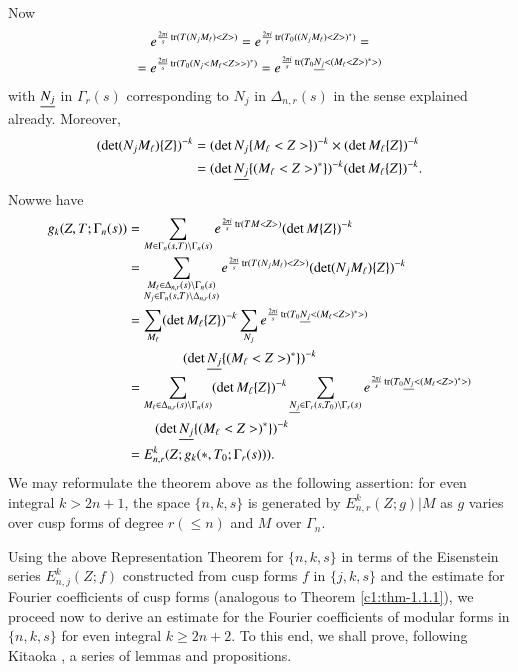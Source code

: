 Now
\begin{gather*}
e^{\frac{2\pi i}{s}\operatorname{tr}(T(N_{j}M_{\ell})<Z>)}=e^{\frac{2\pi
    i}{s}\operatorname{tr}(T_{0}((N_{j}M_{\ell})<Z>)^{\ast})}=\\
=e^{\frac{2\pi
    i}{s}\operatorname{tr}(T_{0}(N_{j}<M_{\ell}<Z>>)^{\ast})}=e^{\frac{2\pi
      i}{s}\operatorname{tr}(T_{0}\underline{N_{j}}<(M_{\ell}<Z>)^{\ast}>)} 
\end{gather*}
with $\underline{N_{j}}$ in $\Gamma_{r}(s)$ corresponding to $N_{j}$ in
$\Delta_{n,r}(s)$ in the sense explained already. Moreover, 
\begin{align*}
(\det
(N_{j}M_{\ell})\{Z\})^{-k}&=(\det N_{j}\{M_{\ell}<Z>\})^{-k}\times
(\det M_{\ell}\{Z\})^{-k}\\
&=(\det
\underline{N_{j}}\{(M_{\ell}<Z>)^{\ast}\})^{-k}(\det M_{\ell}\{Z\})^{-k}.
\end{align*}
Now\pageoriginale we have
{\fontsize{10}{12}\selectfont
\begin{align*}
g_{k}(Z,T;\Gamma_{n}(s)) &=
\sum_{M\in\Gamma_{n}(s,T)\backslash\Gamma_{n}(s)} e^{\frac{2\pi
    i}{s}\operatorname{tr}(TM<Z>)}(\det M\{Z\})^{-k}\\
&=
\sum_{\substack{M_{\ell}\in\Delta_{n,r}(s)\backslash\Gamma_{n}(s)\\ N_{j}\in\Gamma_{n}(s,T)\backslash
\Delta_{n,r}(s)}}e^{\frac{2\pi i}{s}\operatorname{tr}(T(N_{j}M_{\ell})<Z>)}(\det
(N_{j}M_{\ell})\{Z\})^{-k}\\
&= \sum_{M_{\ell}}(\det M_{\ell}\{Z\})^{-k}\sum_{N_{j}}e^{\frac{2\pi
    i}{s}\operatorname{tr}(T_{0}\underline{N_{j}}<(M_{\ell}<Z>)^{\ast}>)}\\
&\qquad\qquad(\det
\underline{N_{j}}\{(M_{\ell}<Z>)^{\ast}\})^{-k}\\ 
&= \sum_{M_{\ell}\in\Delta_{n,r}(s)\backslash \Gamma_{n}(s)}(\det
M_{\ell}\{Z\})^{-k}\sum_{\underline{N_{j}}\in\Gamma_{r}(s,T_{0})\backslash
  \Gamma_{r}(s)}e^{\frac{2\pi
    i}{s}\operatorname{tr}(T_{0}\underline{N_{j}}<(M_{\ell}<Z>)^{\ast}>)}\\
&\qquad(\det
\underline{N_{j}}\{(M_{\ell}<Z>)^{\ast}\})^{-k}\\
&= E^{k}_{n,r}(Z;g_{k}(\ast,T_{0}; \Gamma_{r}(s))).
\end{align*}}
We may reformulate the theorem above as the following assertion: for
even integral $k>2n+1$, the space $\{n,k,s\}$ is generated by
$E^{k}_{n,r}(Z;g)|M$ as $g$ varies over cusp forms of degree $r(\leq
n)$ and $M$ over $\Gamma_{n}$.

Using the above Representation Theorem for $\{n,k,s\}$ in terms of the
Eisenstein series $E^{k}_{n,j}(Z;f)$ constructed from cusp forms $f$
in $\{j,k,s\}$ and the estimate for Fourier coefficients of cusp forms
(analogous to Theorem \ref{c1:thm-1.1.1}), we proceed now to derive an
estimate for the Fourier coefficients of modular forms in $\{n,k,s\}$
for even integral $k\geq 2n+2$. To this end, we shall prove, following
Kitaoka \cite{key10}, a series of lemmas and propositions. 

